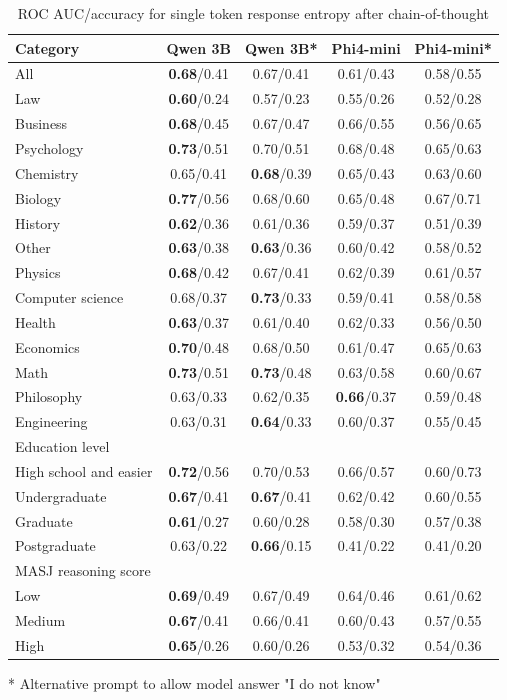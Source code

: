 \begin{table}
\centering
\begin{tabular}{l c c c c}
\hline
Category & Qwen 3B & Qwen 3B* & Phi4-mini & Phi4-mini* \\
\hline
All & \textbf{0.68}/0.41 & 0.67/0.41 & 0.61/0.43 & 0.58/0.55 \\
\hline
Law & \textbf{0.60}/0.24 & 0.57/0.23 & 0.55/0.26 & 0.52/0.28 \\
Business & \textbf{0.68}/0.45 & 0.67/0.47 & 0.66/0.55 & 0.56/0.65 \\
Psychology & \textbf{0.73}/0.51 & 0.70/0.51 & 0.68/0.48 & 0.65/0.63 \\
Chemistry & 0.65/0.41 & \textbf{0.68}/0.39 & 0.65/0.43 & 0.63/0.60 \\
Biology & \textbf{0.77}/0.56 & 0.68/0.60 & 0.65/0.48 & 0.67/0.71 \\
History & \textbf{0.62}/0.36 & 0.61/0.36 & 0.59/0.37 & 0.51/0.39 \\
Other & \textbf{0.63}/0.38 & \textbf{0.63}/0.36 & 0.60/0.42 & 0.58/0.52 \\
Physics & \textbf{0.68}/0.42 & 0.67/0.41 & 0.62/0.39 & 0.61/0.57 \\
Computer science & 0.68/0.37 & \textbf{0.73}/0.33 & 0.59/0.41 & 0.58/0.58 \\
Health & \textbf{0.63}/0.37 & 0.61/0.40 & 0.62/0.33 & 0.56/0.50 \\
Economics & \textbf{0.70}/0.48 & 0.68/0.50 & 0.61/0.47 & 0.65/0.63 \\
Math & \textbf{0.73}/0.51 & \textbf{0.73}/0.48 & 0.63/0.58 & 0.60/0.67 \\
Philosophy & 0.63/0.33 & 0.62/0.35 & \textbf{0.66}/0.37 & 0.59/0.48 \\
Engineering & 0.63/0.31 & \textbf{0.64}/0.33 & 0.60/0.37 & 0.55/0.45 \\
\hline
Education level \\
\hline
High school and easier & \textbf{0.72}/0.56 & 0.70/0.53 & 0.66/0.57 & 0.60/0.73 \\
Undergraduate & \textbf{0.67}/0.41 & \textbf{0.67}/0.41 & 0.62/0.42 & 0.60/0.55 \\
Graduate & \textbf{0.61}/0.27 & 0.60/0.28 & 0.58/0.30 & 0.57/0.38 \\
Postgraduate & 0.63/0.22 & \textbf{0.66}/0.15 & 0.41/0.22 & 0.41/0.20 \\
\hline
MASJ reasoning score \\
\hline
Low & \textbf{0.69}/0.49 & 0.67/0.49 & 0.64/0.46 & 0.61/0.62 \\
Medium & \textbf{0.67}/0.41 & 0.66/0.41 & 0.60/0.43 & 0.57/0.55 \\
High & \textbf{0.65}/0.26 & 0.60/0.26 & 0.53/0.32 & 0.54/0.36 \\
\hline
\end{tabular}
\caption{ROC AUC/accuracy for single token response entropy after chain-of-thought}
\label{tab:roc_auc_cot_entropy}
\footnotesize{* Alternative prompt to allow model answer "I do not know"}\\
\end{table}

